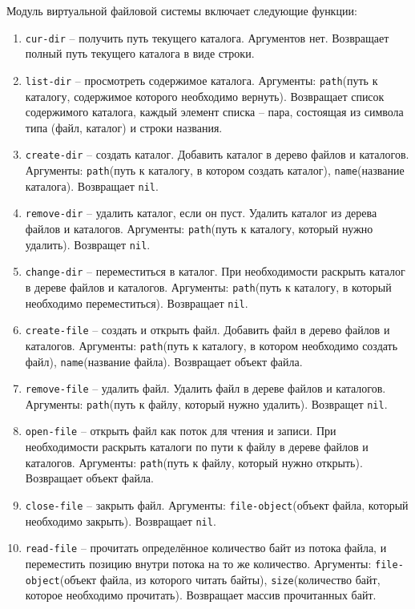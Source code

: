 Модуль виртуальной файловой системы включает следующие функции:

\begin{enumerate}
	\item \texttt{cur-dir} -- получить путь текущего каталога. Аргументов нет. Возвращает полный путь текущего каталога в виде строки.
	\item \texttt{list-dir} -- просмотреть содержимое каталога. Аргументы: \texttt{path}(путь к каталогу, содержимое которого необходимо вернуть). Возвращает список содержимого каталога, каждый элемент списка -- пара, состоящая из символа типа (файл, каталог) и строки названия.
	\item \texttt{create-dir} -- создать каталог. Добавить каталог в дерево файлов и каталогов. Аргументы: \texttt{path}(путь к каталогу, в котором создать каталог), \texttt{name}(название каталога). Возвращает \texttt{nil}.
	\item \texttt{remove-dir} -- удалить каталог, если он пуст. Удалить каталог из дерева файлов и каталогов. Аргументы: \texttt{path}(путь к каталогу, который нужно удалить). Возвращет \texttt{nil}.
	\item \texttt{change-dir} -- переместиться в каталог. При необходимости раскрыть каталог в дереве файлов и каталогов. Аргументы: \texttt{path}(путь к каталогу, в который необходимо переместиться). Возвращает \texttt{nil}.
	\item \texttt{create-file} -- создать и открыть файл. Добавить файл в дерево файлов и каталогов. Аргументы: \texttt{path}(путь к каталогу, в котором необходимо создать файл), \texttt{name}(название файла). Возвращает объект файла.
	\item \texttt{remove-file} -- удалить файл. Удалить файл в дереве файлов и каталогов. Аргументы: \texttt{path}(путь к файлу, который нужно удалить). Возвращет \texttt{nil}.
	\item \texttt{open-file} -- открыть файл как поток для чтения и записи. При необходимости раскрыть каталоги по пути к файлу в дереве файлов и каталогов. Аргументы: \texttt{path}(путь к файлу, который нужно открыть). Возвращает объект файла.
	\item \texttt{close-file} -- закрыть файл. Аргументы: \texttt{file-object}(объект файла, который необходимо закрыть). Возвращает \texttt{nil}.
	\item \texttt{read-file} -- прочитать определённое количество байт из потока файла, и переместить позицию внутри потока на то же количество. Аргументы: \texttt{file-object}(объект файла, из которого читать байты), \texttt{size}(количество байт, которое необходимо прочитать). Возвращает массив прочитанных байт.

\end{enumerate}

